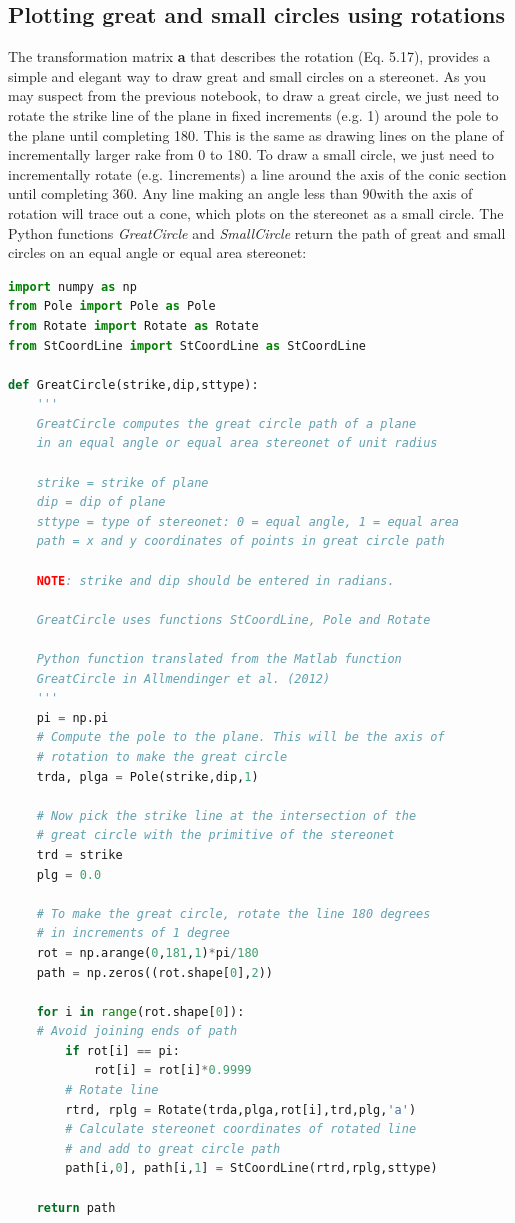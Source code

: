 \documentclass[a4paper , 12pt]{book}
\begin{document}
\subsection{Plotting great and small circles using rotations}

The transformation matrix \textbf{a} that describes the rotation (Eq. 5.17), provides a simple and elegant way to draw great and small circles on a stereonet. As you may suspect from the previous notebook, to draw a great circle, we just need to rotate the strike line of the plane in fixed increments (e.g. 1\degree) around the pole to the plane until completing 180\degree. This is the same as drawing lines on the plane of incrementally larger rake from 0 to 180\degree. To draw a small circle, we just need to incrementally rotate (e.g. 1\degree increments) a line around the axis of the conic section until completing 360\degree. Any line making an angle less than 90\degree with the axis of rotation will trace out a cone, which plots on the stereonet as a small circle. The Python functions \textit{GreatCircle} and \textit{SmallCircle} return the path of great and small circles on an equal angle or equal area stereonet:

\begin{lstlisting}[language=Python, frame=single]
import numpy as np
from Pole import Pole as Pole
from Rotate import Rotate as Rotate
from StCoordLine import StCoordLine as StCoordLine

def GreatCircle(strike,dip,sttype):
    '''
	GreatCircle computes the great circle path of a plane 
	in an equal angle or equal area stereonet of unit radius
	
	strike = strike of plane
	dip = dip of plane
	sttype = type of stereonet: 0 = equal angle, 1 = equal area
	path = x and y coordinates of points in great circle path
	
	NOTE: strike and dip should be entered in radians. 
	
	GreatCircle uses functions StCoordLine, Pole and Rotate
	
	Python function translated from the Matlab function
	GreatCircle in Allmendinger et al. (2012)
	'''
    pi = np.pi
	# Compute the pole to the plane. This will be the axis of 
	# rotation to make the great circle
    trda, plga = Pole(strike,dip,1)
    
	# Now pick the strike line at the intersection of the 
    # great circle with the primitive of the stereonet
    trd = strike
    plg = 0.0
    
	# To make the great circle, rotate the line 180 degrees 
	# in increments of 1 degree
    rot = np.arange(0,181,1)*pi/180
    path = np.zeros((rot.shape[0],2))
    
    for i in range(rot.shape[0]):
	# Avoid joining ends of path
        if rot[i] == pi:
            rot[i] = rot[i]*0.9999
		# Rotate line
        rtrd, rplg = Rotate(trda,plga,rot[i],trd,plg,'a')
		# Calculate stereonet coordinates of rotated line 
		# and add to great circle path
        path[i,0], path[i,1] = StCoordLine(rtrd,rplg,sttype)
    
    return path
\end{lstlisting}
\end{document}
